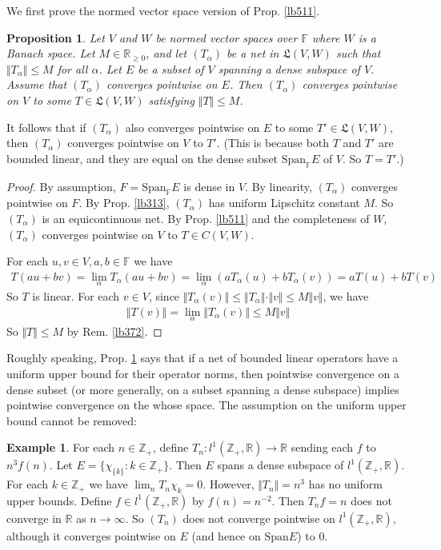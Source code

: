 \documentclass[12pt,b5paper,notitlepage]{article}
\theoremstyle{definition}
\newtheorem{eg}[df]{Example}
\theoremstyle{plain}
\newtheorem{pp}[df]{Proposition}
\newcommand{\fk}{\mathfrak}
\newcommand{\Span}{\mathrm{Span}}
\newcommand{\Zbb}{\mathbb Z}
\newcommand{\Rbb}{\mathbb R}
\newcommand{\Fbb}{\mathbb F}
\numberwithin{equation}{section}
\begin{document}
We first prove the normed vector space version of Prop. \ref{lb511}.


\begin{pp}\label{lb520}
Let $V$ and $W$ be normed vector spaces over $\Fbb$ where $W$ is a Banach space. Let $M\in\Rbb_{\geq0}$, and let $(T_\alpha)$ be a net in $\fk L(V,W)$ such that $\Vert T_\alpha\Vert\leq M$ for all $\alpha$. Let $E$ be a subset of $V$ spanning a dense subspace of $V$. Assume that $(T_\alpha)$ converges pointwise on $E$. Then $(T_\alpha)$ converges pointwise on $V$ to some $T\in\fk L(V,W)$ satisfying $\Vert T\Vert\leq M$.
\end{pp}

It follows that if $(T_\alpha)$ also converges pointwise on $E$ to some $T'\in\fk L(V,W)$, then $(T_\alpha)$ converges pointwise on $V$ to $T'$. (This is because both $T$ and $T'$ are bounded linear, and they are equal on the dense subset $\Span_\Fbb E$ of $V$. So $T=T'$.)

\begin{proof}
By assumption, $F=\Span_\Fbb E$ is dense in $V$. By linearity, $(T_\alpha)$ converges pointwise on $F$. By Prop. \ref{lb313}, $(T_\alpha)$ has uniform Lipschitz constant $M$. So $(T_\alpha)$ is an equicontinuous net. By Prop. \ref{lb511} and the completeness of $W$, $(T_\alpha)$ converges pointwise on $V$ to $T\in C(V,W)$.

For each $u,v\in V,a,b\in\Fbb$ we have
\begin{align*}
T(au+bv)=\lim_\alpha T_\alpha(au+bv)=\lim_\alpha (a T_\alpha(u)+b T_\alpha(v))=a T(u)+b T(v)
\end{align*}
So $T$ is linear. For each $v\in V$, since $\Vert T_\alpha(v)\Vert\leq \Vert T_\alpha\Vert\cdot\Vert v\Vert\leq M \Vert v\Vert$, we have
\begin{align*}
\Vert T(v)\Vert=\lim_\alpha\Vert T_\alpha(v)\Vert\leq M\Vert v\Vert
\end{align*}
So $\Vert T\Vert\leq M$ by Rem. \ref{lb372}.
\end{proof}


Roughly speaking, Prop. \ref{lb520} says that if a net of bounded linear operators have a uniform upper bound for their operator norms, then pointwise convergence on a dense subset (or more generally, on a subset spanning a dense subspace) implies pointwise convergence on the whose space. The assumption on the uniform upper bound cannot be removed:
\begin{eg}
For each $n\in\Zbb_+$, define $T_n:l^1(\Zbb_+,\Rbb)\rightarrow\Rbb$ sending each $f$ to $n^3f(n)$. Let $E=\{\chi_{\{k\}}:k\in\Zbb_+\}$. Then $E$ spans a dense subspace of $l^1(\Zbb_+,\Rbb)$. For each $k\in\Zbb_+$ we have $\lim_n T_n\chi_{k}=0$. However, $\Vert T_n\Vert=n^3$ has no uniform upper bounds. Define $f\in l^1(\Zbb_+,\Rbb)$ by $f(n)=n^{-2}$. Then $T_nf=n$ does not converge in $\Rbb$ as $n\rightarrow\infty$. So $(T_n)$ does not converge pointwise on $l^1(\Zbb_+,\Rbb)$, although it converges pointwise on $E$ (and hence on $\Span E$) to $0$.
\end{eg}
\end{document}
